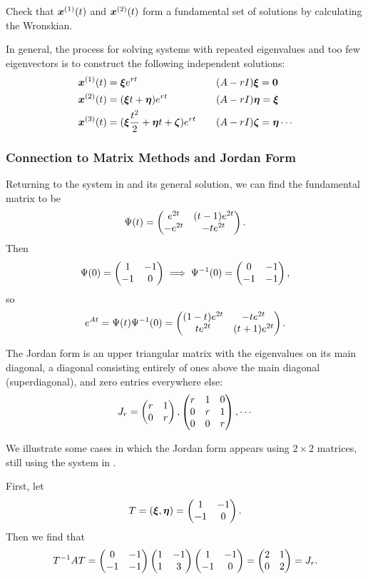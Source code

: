 \begin{exercise}
	Check that $\bm{x}^{(1)}(t)$ and $\bm{x}^{(2)}(t)$ form a fundamental set of solutions by calculating the Wronskian.
\end{exercise}

In general, the process for solving systems with repeated eigenvalues and too few eigenvectors is to construct the following independent solutions:
\begin{equation*}
	\begin{alignedat}{2}
		\bm{x}^{(1)}(t) &= \bm{\xi} e^{rt} \qquad &&(A-rI)\bm{\xi} = \bm{0} \\
		\bm{x}^{(2)}(t) &= (\bm{\xi} t + \bm{\eta})e^{rt} \qquad && (A-rI)\bm{\eta} = \bm{\xi} \\
		\bm{x}^{(3)}(t) &= (\bm{\xi} \frac{t^2}{2} + \bm{\eta} t + \bm{\zeta})e^{rt} \qquad &&(A-rI)\bm{\zeta} = \bm{\eta} \cdots
	\end{alignedat}
\end{equation*}

\subsubsection{Connection to Matrix Methods and Jordan Form}

Returning to the system in  and its general solution, we can find the fundamental matrix to be
\[
\Psi(t) = \begin{pmatrix}e^{2t} & (t-1)e^{2t} \\ -e^{2t} & -te^{2t}\end{pmatrix}.
\]
Then
\[
\Psi(0) = \begin{pmatrix}1 & -1 \\ -1 & 0\end{pmatrix}	\implies \Psi^{-1}(0) = \begin{pmatrix}0 & -1 \\ -1 & -1\end{pmatrix},
\]
so
\[
e^{At} = \Psi(t)\Psi^{-1}(0) = \begin{pmatrix}(1-t)e^{2t} & -te^{2t} \\ te^{2t} & (t+1)e^{2t}\end{pmatrix}.
\]

The Jordan form is an upper triangular matrix with the eigenvalues on its main diagonal, a diagonal consisting entirely of ones above the main diagonal (superdiagonal), and zero entries everywhere else:
\[
J_r = \begin{pmatrix}r & 1 \\ 0 & r\end{pmatrix}, \begin{pmatrix}r & 1 & 0 \\ 0 & r & 1 \\ 0 & 0 & r\end{pmatrix}, \cdots
\]

We illustrate some cases in which the Jordan form appears using $2 \times 2$ matrices, still using the system in .

First, let
\[
T = (\bm{\xi}, \bm{\eta}) = \begin{pmatrix}1 & -1 \\ -1 & 0\end{pmatrix}.
\]
Then we find that
\[
T^{-1}AT = \begin{pmatrix}0 & -1 \\ -1 & -1\end{pmatrix} \begin{pmatrix}1 & -1 \\ 1 & 3\end{pmatrix} \begin{pmatrix}1 & -1 \\ -1 & 0\end{pmatrix} = \begin{pmatrix}2 & 1 \\ 0 & 2\end{pmatrix} = J_r.
\]

